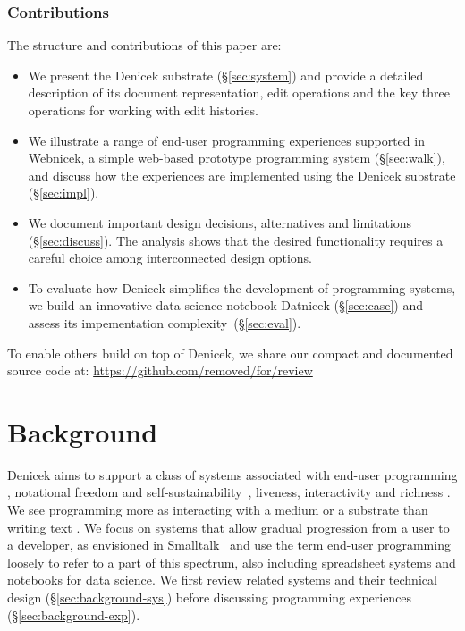 \documentclass[sigconf,anonymous,screen]{acmart}
\begin{document}
\subsubsection*{Contributions}
The structure and contributions of this paper are:

\begin{itemize}
\item We present the Denicek substrate (\S\ref{sec:system}) and provide a detailed description of its
  document representation, edit operations and the key three operations for working with edit histories.
\item We illustrate a range of end-user programming experiences supported in Webnicek, a simple
  web-based prototype programming system (\S\ref{sec:walk}), and discuss how the experiences are
  implemented using the Denicek substrate (\S\ref{sec:impl}).
\item We document important design decisions, alternatives and limitations (\S\ref{sec:discuss}).
  The analysis shows that the desired functionality requires a careful choice among interconnected
  design options.
\item To evaluate how Denicek simplifies the development of program\-ming systems, we
  build an innovative data science notebook Datnicek (\S\ref{sec:case})
  and assess its impementation complexity~(\S\ref{sec:eval}).
\end{itemize}

\noindent
To enable others build on top of Denicek, we share our compact and documented
source code at: \url{https://github.com/removed/for/review} %


\section{Background}
\label{sec:background}
Denicek aims to support a class of systems associated with end-user programming \cite{myers-2006-eup},
notational freedom and self-sustainability~\cite{jakubovic-2023-techdims}, liveness, interactivity
and richness \cite{horowitz-2023-qualities,rein-2019-live}. We see programming more as interacting with a medium
or a substrate \cite{kay-1977-media,klokmose-2015-webstrates} than writing text \cite{rpg-2012-revolution}.
We focus on systems that allow gradual progression from a user to a developer, as envisioned
in Smalltalk~\cite{reenskaug-1981-byte} and use the term end-user programming loosely to refer to a
part of this spectrum, also including spreadsheet systems and notebooks for data science.
We first review related systems and their technical design (\S\ref{sec:background-sys})
before discussing programming experiences (\S\ref{sec:background-exp}).
\end{document}
